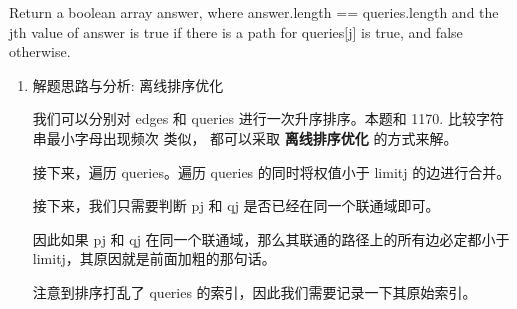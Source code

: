 \documentclass[9pt, b5paaper]{book}
\begin{document}
Return a boolean array answer, where answer.length == queries.length and the jth value of answer is true if there is a path for queries[j] is true, and false otherwise.
\begin{enumerate}
\item 解题思路与分析: 离线排序优化
\label{sec-10-0-1-1}

我们可以分别对 edges 和 queries 进行一次升序排序。本题和 1170. 比较字符串最小字母出现频次 类似， 都可以采取 \textbf{离线排序优化} 的方式来解。

接下来，遍历 queries。遍历 queries 的同时将权值小于 limitj 的边进行合并。

接下来，我们只需要判断 pj 和 qj 是否已经在同一个联通域即可。

因此如果 pj 和 qj 在同一个联通域，那么其联通的路径上的所有边必定都小于 limitj，其原因就是前面加粗的那句话。

注意到排序打乱了 queries 的索引，因此我们需要记录一下其原始索引。


\end{enumerate}
\end{document}
